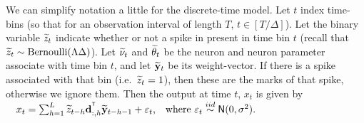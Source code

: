 We can simplify notation a little for the discrete-time model. Let $t$ index time-bins (so that for an observation interval of length 
$T$, $t \in [T/\Delta]$).
Let the binary variable $\widetilde{z}_t$ indicate whether or not a spike in present in time bin $t$ (recall that 
$\widetilde{z}_t \sim \text{Bernoulli}(\Lambda \Delta)$). Let
$\widetilde{\nu}_t$ and $\widetilde{\theta}_t$ be the neuron and neuron parameter associate with time bin $t$, and let $\widetilde{\mathbf{y}}_t$ be its weight-vector. 
If there is a spike associated with that bin (i.e.\ 
$\widetilde{z}_t = 1$), then these are the marks of that spike, otherwise we ignore them.
Then the output at time $t$, $x_t$ is given by
$\quad  x_t = \sum_{h = 1}^L \widetilde{z}_{t-h} \mathsf{\mathbf{d}}_{:,h}^{^{\mathsf{T}}} \widetilde{\mathbf{y}}_{t-h-1} + \varepsilon_t \text{,\quad where $\varepsilon_t \overset{iid}{\sim} \mathsf{N}(0,\sigma^2)$.}$ 
